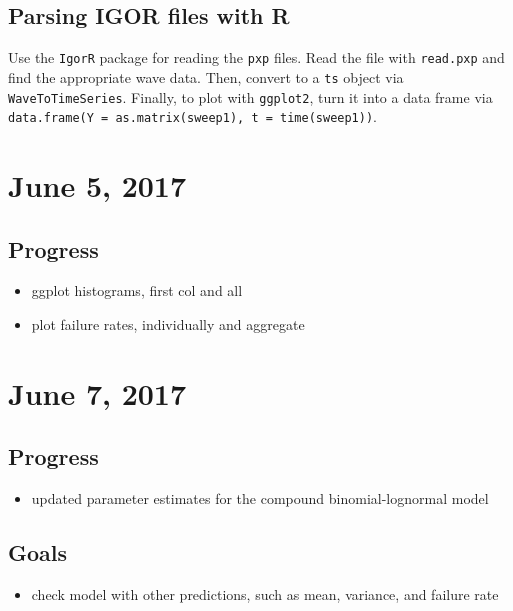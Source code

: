 \documentclass{article}
\begin{document}
\subsection{Parsing IGOR files with R}
Use the \texttt{IgorR} package for reading the \texttt{pxp} files. Read the file with \texttt{read.pxp} and find the appropriate wave data. Then, convert to a \texttt{ts} object via \texttt{WaveToTimeSeries}. Finally, to plot with \texttt{ggplot2}, turn it into a data frame via \texttt{data.frame(Y = as.matrix(sweep1), t = time(sweep1))}.

\section{June 5, 2017}
\subsection{Progress}
\begin{itemize}
  \item ggplot histograms, first col and all
  \item plot failure rates, individually and aggregate
\end{itemize}

\section{June 7, 2017}
\subsection{Progress}
\begin{itemize}
  \item updated parameter estimates for the compound binomial-lognormal model
\end{itemize}

\subsection{Goals}
\begin{itemize}
  \item check model with other predictions, such as mean, variance, and failure rate
\end{itemize}
\end{document}
